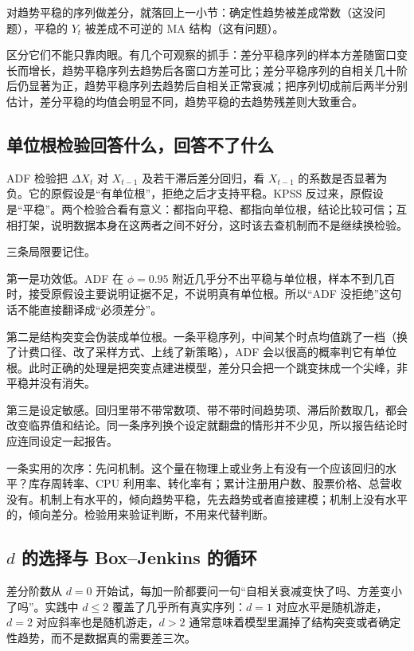 对趋势平稳的序列做差分，就落回上一小节：确定性趋势被差成常数（这没问题），平稳的 \(Y_t\) 被差成不可逆的 MA 结构（这有问题）。

区分它们不能只靠肉眼。有几个可观察的抓手：差分平稳序列的样本方差随窗口变长而增长，趋势平稳序列去趋势后各窗口方差可比；差分平稳序列的自相关几十阶后仍显著为正，趋势平稳序列去趋势后自相关正常衰减；把序列切成前后两半分别估计，差分平稳的均值会明显不同，趋势平稳的去趋势残差则大致重合。

\subsection{单位根检验回答什么，回答不了什么}

ADF 检验把 \(\Delta X_t\) 对 \(X_{t-1}\) 及若干滞后差分回归，看 \(X_{t-1}\) 的系数是否显著为负。它的原假设是``有单位根''，拒绝之后才支持平稳。KPSS 反过来，原假设是``平稳''。两个检验合看有意义：都指向平稳、都指向单位根，结论比较可信；互相打架，说明数据本身在这两者之间不好分，这时该去查机制而不是继续换检验。

三条局限要记住。

第一是功效低。ADF 在 \(\phi=0.95\) 附近几乎分不出平稳与单位根，样本不到几百时，接受原假设主要说明证据不足，不说明真有单位根。所以``ADF 没拒绝''这句话不能直接翻译成``必须差分''。

第二是结构突变会伪装成单位根。一条平稳序列，中间某个时点均值跳了一档（换了计费口径、改了采样方式、上线了新策略），ADF 会以很高的概率判它有单位根。此时正确的处理是把突变点建进模型，差分只会把一个跳变抹成一个尖峰，非平稳并没有消失。

第三是设定敏感。回归里带不带常数项、带不带时间趋势项、滞后阶数取几，都会改变临界值和结论。同一条序列换个设定就翻盘的情形并不少见，所以报告结论时应连同设定一起报告。

一条实用的次序：先问机制。这个量在物理上或业务上有没有一个应该回归的水平？库存周转率、CPU 利用率、转化率有；累计注册用户数、股票价格、总营收没有。机制上有水平的，倾向趋势平稳，先去趋势或者直接建模；机制上没有水平的，倾向差分。检验用来验证判断，不用来代替判断。

\subsection{\texorpdfstring{\(d\)}{d} 的选择与 Box--Jenkins 的循环}

差分阶数从 \(d=0\) 开始试，每加一阶都要问一句``自相关衰减变快了吗、方差变小了吗''。实践中 \(d\le2\) 覆盖了几乎所有真实序列：\(d=1\) 对应水平是随机游走，\(d=2\) 对应斜率也是随机游走，\(d>2\) 通常意味着模型里漏掉了结构突变或者确定性趋势，而不是数据真的需要差三次。

